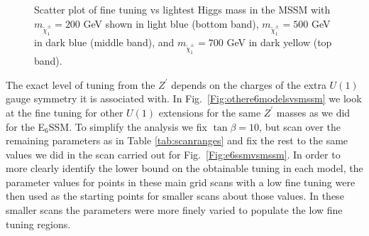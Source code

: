 \documentclass[preprint,amsmath,amssymb,aps,superscriptaddress,prd,showpacs,floatfix,nofootinbib]{revtex4-1}
\begin{document}
\begin{figure}[h]
\begin{center}
\caption{Scatter plot of fine tuning vs lightest Higgs mass in the MSSM with $m_{\tilde{\chi}^\pm_1} = 200$ GeV shown in light blue 
(bottom band), $m_{\tilde{\chi}^\pm_1} = 500$ GeV in dark blue (middle band), and $m_{\tilde{\chi}^\pm_1} = 700$ GeV in dark yellow
(top band).}
\label{Fig:chargino-plot}
\end{center}
\end{figure}

The exact level of tuning from the $Z^\prime$ depends on the charges
of the extra $U(1)$ gauge symmetry it is associated with.  In
Fig.~\ref{Fig:othere6modelsvsmssm} we look at the fine tuning for
other $U(1)$ extensions for the same $Z^\prime$ masses as we did for the
E$_6$SSM.  To simplify the analysis we fix $\tan \beta = 10$, but scan
over the remaining parameters as in Table \ref{tab:scanranges} and fix
the rest to the same values we did in the scan carried out for
Fig.~\ref{Fig:e6ssmvsmssm}. In order to more clearly identify the lower bound
on the obtainable tuning in each model, the parameter values for points in
these main grid scans with a low fine tuning were then used as the starting points for
smaller scans about those values. In these smaller scans the parameters were more finely
varied to populate the low fine tuning regions.
\end{document}
